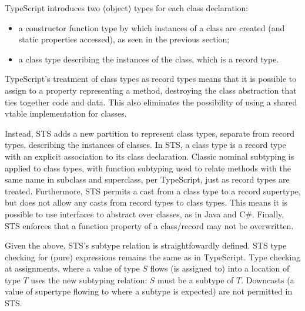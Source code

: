 TypeScript introduces two (object) types for each class declaration:
\begin{itemize}
\item a constructor function type by which instances of a class
are created (and static properties accessed), as seen in the previous section;
\item a class type describing the instances of the class, which is a record type.
\end{itemize}
TypeScript's treatment of class types as record types
means that it is possible to assign to a property representing a method,
destroying the class abstraction that ties together code and data.
This also eliminates the possibility of using a shared vtable implementation for classes.

Instead, STS adds a new partition to represent class types, separate from record types,
describing the instances of classes. In STS, a class type is a
record type with an explicit association to its class declaration.
Classic nominal subtyping is applied to class types, with function subtyping used to relate methods with
the same name in subclass and superclass, per TypeScript, just as record types are treated.
Furthermore, STS permits a cast from a class type
to a record supertype, but does not allow any casts from record types to class types. This means
it is possible to use interfaces to abstract over classes, as in Java and C\#.
Finally, STS enforces that a function property of a class/record may not be overwritten. 

Given the above, STS's subtype relation is straightfowardly defined.
STS type checking for (pure) expressions remains the same as in TypeScript.
Type checking at assignments, where a value of type $S$ flows (is assigned to)
into a location of type $T$ uses the new subtyping relation: $S$
must be a subtype of $T$.  Downcasts (a value of supertype flowing to where a subtype
is expected) are not permitted in STS.



